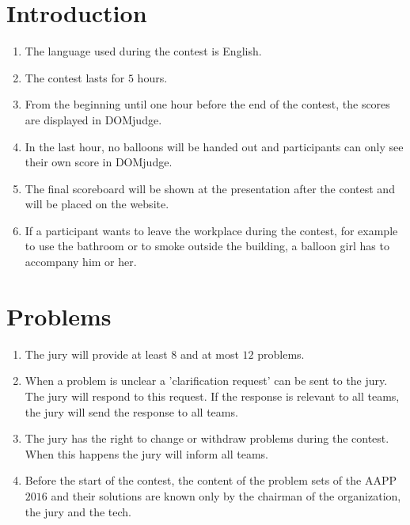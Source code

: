 \documentclass[11pt]{report}
\begin{document}
\section{Introduction}
\begin{enumerate}[label=\bfseries 4.1.\arabic*]
\item The language used during the contest is English.
\item The contest lasts for $5$ hours.
\item From the beginning until one hour before the end of the contest, the scores are displayed in DOMjudge.
\item In the last hour, no balloons will be handed out and participants can only see their own score in DOMjudge.
\item The final scoreboard will be shown at the presentation after the contest and will be placed on the website.
\item \label{leaveTheWorkplace} If a participant wants to leave the workplace during the contest, for example to use the bathroom or to smoke outside the building, a balloon girl has to accompany him or her.
\end{enumerate}

\section{Problems}
\begin{enumerate}[label=\bfseries 4.2.\arabic*]
\item The jury will provide at least $8$ and at most $12$ problems.
\item When a problem is unclear a 'clarification request' can be sent to the jury. The jury will respond to this request. If the response is relevant to all teams, the jury will send the response to all teams.
\item The jury has the right to change or withdraw problems during the contest. When this happens the jury will inform all teams.
\item \label{content} Before the start of the contest, the content of the problem sets of the AAPP $2016$ and their solutions are known only by the chairman of the organization, the jury and the tech.
\end{enumerate}
\end{document}
